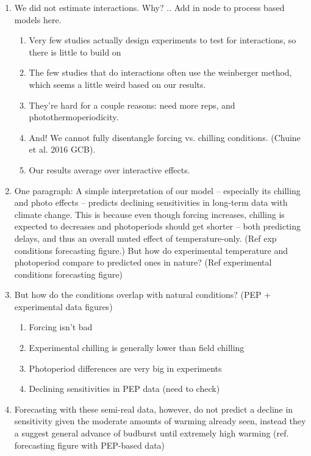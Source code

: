 \documentclass[11pt,letter]{article}
\begin{document}
{\begin{enumerate}
\begin{enumerate}
\item The magnitude of photoperiod effects varies with latitude, with lower source latitudes generally having earlier budburst. Say provenance (population). 
\end{enumerate}
\item We did not estimate interactions. Why? ..  Add in node to process based models here. 
\begin{enumerate}
\item Very few studies actually design experiments to test for interactions, so there is little to build on
\item The few studies that do interactions often use the weinberger method, which seems a little weird based on our results.
\item They're hard for a couple reasons: need more reps, and photothermoperiodicity.
\item And! We cannot fully disentangle forcing vs. chilling conditions. (Chuine et al. 2016 GCB).
\item Our results average over interactive effects. 
\end{enumerate}
\item One paragraph: A simple interpretation of our model -- especially its chilling and photo effects -- predicts declining sensitivities in long-term data with climate change. This is because even though forcing increases, chilling is expected to decreases and photoperiods should get shorter -- both predicting delays, and thus an overall muted effect of temperature-only.  (Ref exp conditions forecasting figure.) But how do experimental temperature and photoperiod compare to predicted ones in nature? (Ref experimental conditions forecasting figure)
\item But how do the conditions overlap with natural conditions? (PEP + experimental data figures)
\begin{enumerate}
\item Forcing isn't bad
\item Experimental chilling is generally lower than field chilling
\item Photoperiod differences are very big in experiments
\item Declining sensitivities in PEP data (need to check)
\end{enumerate}
\item Forecasting with these semi-real data, however, do not predict a decline in sensitivity given the moderate amounts of warming already seen, instead they a suggest general advance of budburst until extremely high warming (ref. forecasting figure with PEP-based data)

\end{enumerate}}
\end{document}
